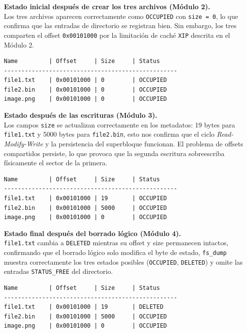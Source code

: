 \documentclass[12pt,letterpaper]{article}
\begin{document}
\bigskip

\textbf{Estado inicial después de crear los tres archivos (Módulo 2).}\\
Los tres archivos aparecen correctamente como \texttt{OCCUPIED} con \texttt{size = 0}, lo que confirma que las
entradas de directorio se registran bien. Sin embargo, los tres comparten el offset \texttt{0x00101000} por la
limitación de caché \texttt{XIP} descrita en el Módulo 2.

\begin{Verbatim}[frame=single, fontsize=\footnotesize]
Name         | Offset     | Size     | Status
--------------------------------------------------
file1.txt    | 0x00101000 | 0        | OCCUPIED
file2.bin    | 0x00101000 | 0        | OCCUPIED
image.png    | 0x00101000 | 0        | OCCUPIED
\end{Verbatim}

\bigskip

\textbf{Estado después de las escrituras (Módulo 3).}\\
Los campos \texttt{size} se actualizan correctamente en los metadatos: 19 bytes para \texttt{file1.txt} y 5000
bytes para \texttt{file2.bin}, esto nos confirma que el ciclo \textit{Read-Modify-Write} y la persistencia del
superbloque funcionan. El problema de offsets compartidos persiste, lo que provoca que la segunda escritura
sobreescriba físicamente el sector de la primera.

\begin{Verbatim}[frame=single, fontsize=\footnotesize]
Name         | Offset     | Size     | Status
--------------------------------------------------
file1.txt    | 0x00101000 | 19       | OCCUPIED
file2.bin    | 0x00101000 | 5000     | OCCUPIED
image.png    | 0x00101000 | 0        | OCCUPIED
\end{Verbatim}

\bigskip

\textbf{Estado final después del borrado lógico (Módulo 4).}\\
\texttt{file1.txt} cambia a \texttt{DELETED} mientras su offset y size permanecen intactos, confirmando que el
borrado lógico solo modifica el byte de estado, \texttt{fs\_dump} muestra correctamente los tres estados
posibles (\texttt{OCCUPIED}, \texttt{DELETED}) y omite las entradas \texttt{STATUS\_FREE} del directorio.

\begin{Verbatim}[frame=single, fontsize=\footnotesize]
Name         | Offset     | Size     | Status
--------------------------------------------------
file1.txt    | 0x00101000 | 19       | DELETED
file2.bin    | 0x00101000 | 5000     | OCCUPIED
image.png    | 0x00101000 | 0        | OCCUPIED
\end{Verbatim}
\end{document}
